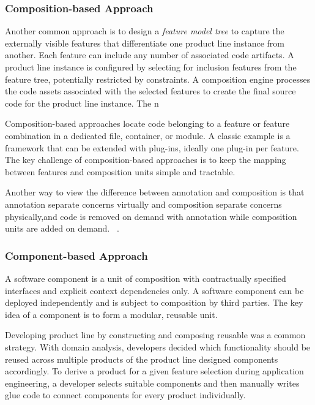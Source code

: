 \subsubsection{Composition-based Approach}

Another common approach is to design a \textit{feature model tree} to capture the
externally visible features that differentiate one product line instance
from another. Each feature can include any number of associated code
artifacts. A product line instance is configured by selecting
for inclusion features from the feature tree, potentially restricted by
constraints. A composition engine processes the code assets associated
with the selected features to create the final source code for the
product line instance. The n

Composition-based approaches locate code belonging to a feature or
feature combination in a dedicated file, container, or module. A classic
example is a framework that can be extended with plug-ins, ideally one
plug-in per feature. The key challenge of composition-based approaches
is to keep the mapping between features and composition units simple and
tractable.

Another way to view the difference between annotation and composition is
that annotation separate concerns virtually and composition separate
concerns physically,and code is removed on demand with annotation while
composition units are added on demand.
~\cite{Thum:2014:FEF:2537169.2537315,Apel:2013:FSP:2541773}.

\subsubsection{Component-based Approach}

A software component is a unit of composition with contractually
specified interfaces and explicit context dependencies only. A software
component can be deployed independently and is subject to composition by
third parties. The key idea of a component is to form a modular,
reusable unit.

Developing product line by constructing and composing reusable was a
common strategy. With domain analysis, developers decided which
functionality should be reused across multiple products of the product
line designed components accordingly. To derive a product for a given
feature selection during application engineering, a developer selects
suitable components and then manually writes glue code to connect
components for every product individually.



